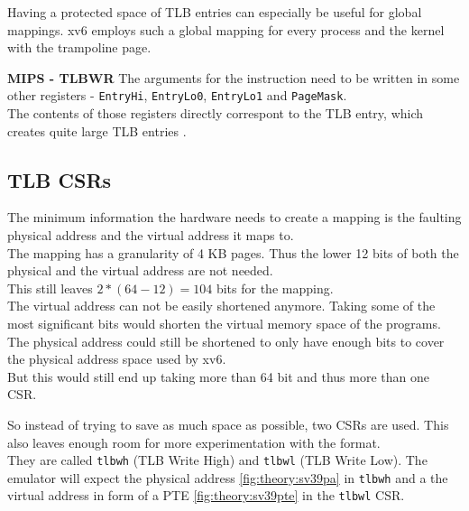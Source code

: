 Having a protected space of TLB entries can especially be useful for global mappings. xv6 employs such a global
mapping for every process and the kernel with the trampoline page.

\textbf{MIPS - TLBWR} The arguments for the instruction need to be written in some
other registers - \texttt{EntryHi}, \texttt{EntryLo0}, \texttt{EntryLo1} and \texttt{PageMask}.\\
The contents of those registers directly correspont to the TLB entry, which creates quite large
TLB entries \cite{heiserAnatomyHighPerformanceMicrokernel}.



\subsection{TLB CSRs}
The minimum information the hardware needs to create a mapping is the faulting physical address and
the virtual address it maps to.\\
The mapping has a granularity of 4 KB pages. Thus the lower 12 bits of both the physical and the
virtual address are not needed.\\
This still leaves $2*(64-12)=104$ bits for the mapping.\\
The virtual address can not be easily shortened anymore. Taking some of the most significant bits
would shorten the virtual memory space of the programs.\\
The physical address could still be shortened to only have enough bits to cover the physical address
space used by xv6.\\
But this would still end up taking more than 64 bit and thus more than one CSR.

So instead of trying to save as much space as possible, two CSRs are used.
This also leaves enough room for more experimentation with the format.\\
They are called \texttt{tlbwh} (TLB Write High) and \texttt{tlbwl} (TLB Write Low).
The emulator will expect the physical address \ref{fig:theory:sv39pa} in \texttt{tlbwh} and a the virtual address in form
of a PTE \ref{fig:theory:sv39pte} in the \texttt{tlbwl} CSR.


